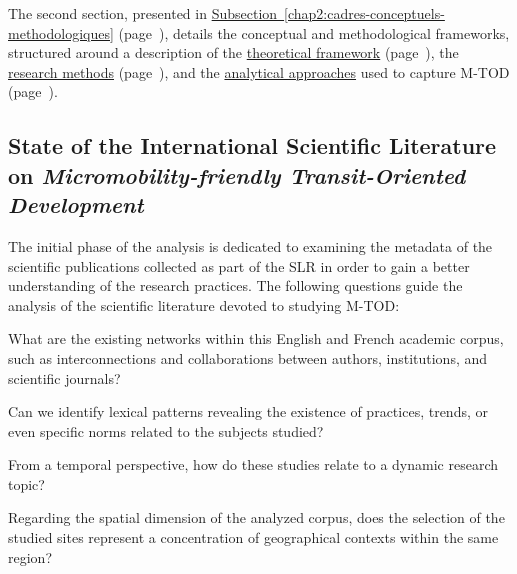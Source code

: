 \begin{refsegment}
The second section, presented in \hyperref[chap2:cadres-conceptuels-methodologiques]{Subsection~\ref{chap2:cadres-conceptuels-methodologiques}} (page~\pageref{chap2:cadres-conceptuels-methodologiques}), details the conceptual and methodological frameworks, structured around a description of the \hyperref[chap2:fondements-theoriques]{theoretical framework} (page~\pageref{chap2:fondements-theoriques}), the \hyperref[chap2:methodes-collecte-donnees]{research methods} (page~\pageref{chap2:methodes-collecte-donnees}), and the \hyperref[chap2:demarches-types-analyses]{analytical approaches} used to capture \acrshort{M-TOD} (page~\pageref{chap2:demarches-types-analyses}).%

\subsection{State of the International Scientific Literature on \textsl{Micromobility-friendly Transit-Oriented Development}
    \label{chap2:etat-litterature-scientifique-internationale-btod}
    }
    
The initial phase of the analysis is dedicated to examining the metadata of the scientific publications collected as part of the \acrshort{SLR} in order to gain a better understanding of the research practices. The following questions guide the analysis of the scientific literature devoted to studying \acrshort{M-TOD}:
    \begin{customitemize}
        \item What are the existing networks within this English and French academic corpus, such as interconnections and collaborations between authors, institutions, and scientific journals?
        \item Can we identify lexical patterns revealing the existence of practices, trends, or even specific norms related to the subjects studied?
        \item From a temporal perspective, how do these studies relate to a dynamic research topic?
        \item Regarding the spatial dimension of the analyzed corpus, does the selection of the studied sites represent a concentration of geographical contexts within the same region?
    \end{customitemize}%


\end{refsegment}
